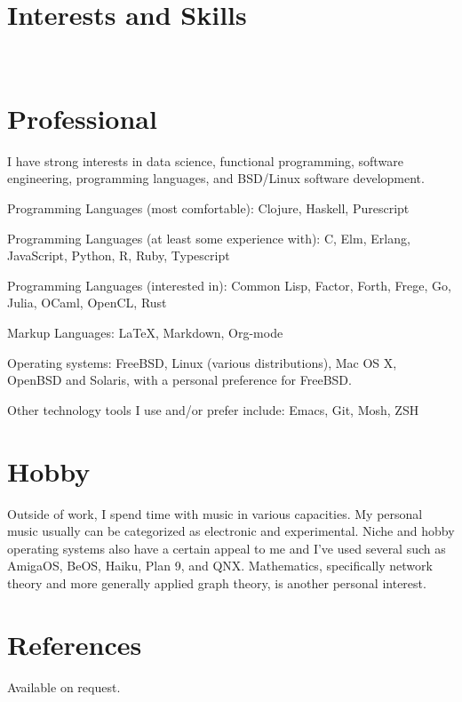 \documentclass[margintitle,line]{res}
\renewcommand{\subsection}[1]{\section{\normalfont #1}}
\begin{document}
\begin{resume}

\section{Interests and Skills}
\ \\
\subsection{Professional}

I have strong interests in data science, functional programming,
software engineering, programming languages, and BSD/Linux software development.

Programming Languages (most comfortable): Clojure, Haskell, Purescript

Programming Languages (at least some experience with): C, Elm, Erlang, JavaScript, Python, R, Ruby, Typescript

Programming Languages (interested in): Common Lisp, Factor, Forth, Frege, Go, Julia, OCaml, OpenCL, Rust

Markup Languages: LaTeX, Markdown, Org-mode

Operating systems: FreeBSD, Linux (various distributions), Mac OS X, OpenBSD and Solaris,
with a personal preference for FreeBSD.

Other technology tools I use and/or prefer include: Emacs, Git, Mosh, ZSH
\subsection{Hobby}

Outside of work, I spend time with music in various
capacities. My personal music usually can be categorized as electronic
and experimental. Niche and hobby operating systems also have a certain appeal
to me and I've used several such as AmigaOS, BeOS, Haiku, Plan 9, and QNX.
Mathematics, specifically network theory and more generally applied graph
theory, is another personal interest.

\section{References}

Available on request.

\end{resume}
\end{document}
